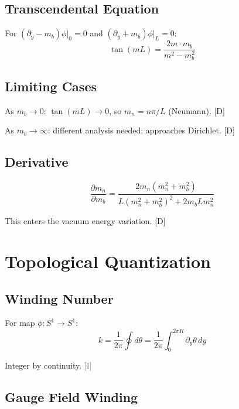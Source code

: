 \documentclass[11pt,a4paper]{article}
\newcommand{\tagD}{\textcolor{blue!70!black}{[D]}}
\newcommand{\tagI}{\textcolor{gray}{[I]}}
\begin{document}
\subsection{Transcendental Equation}

For $(\partial_y - m_b)\phi|_0 = 0$ and $(\partial_y + m_b)\phi|_L = 0$:
\begin{equation}
\label{eq:app-robin-trans}
\tan(mL) = \frac{2m \cdot m_b}{m^2 - m_b^2}
\end{equation}

\subsection{Limiting Cases}

As $m_b \to 0$: $\tan(mL) \to 0$, so $m_n = n\pi/L$ (Neumann). \tagD

As $m_b \to \infty$: different analysis needed; approaches Dirichlet. \tagD

\subsection{Derivative}

\begin{equation}
\label{eq:app-dm-dmb}
\frac{\partial m_n}{\partial m_b} = \frac{2m_n(m_n^2 + m_b^2)}{L(m_n^2 + m_b^2)^2 + 2m_b L m_n^2}
\end{equation}

This enters the vacuum energy variation. \tagD

\section{Topological Quantization}
\label{app:topo}

\subsection{Winding Number}

For map $\phi: S^1 \to S^1$:
\begin{equation}
\label{eq:app-winding}
k = \frac{1}{2\pi} \oint d\theta = \frac{1}{2\pi} \int_0^{2\pi R} \partial_y \theta \, dy
\end{equation}

Integer by continuity. \tagI

\subsection{Gauge Field Winding}
\end{document}

